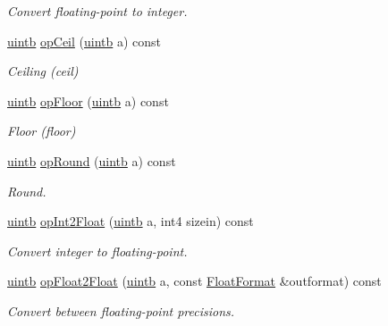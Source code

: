 \begin{DoxyCompactItemize}
\begin{DoxyCompactList}\small\item\em Convert floating-\/point to integer. \end{DoxyCompactList}\item 
\mbox{\hyperlink{types_8h_a2db313c5d32a12b01d26ac9b3bca178f}{uintb}} \mbox{\hyperlink{class_float_format_a997db68ddb2ee0835f3ffde93f4c4958}{op\+Ceil}} (\mbox{\hyperlink{types_8h_a2db313c5d32a12b01d26ac9b3bca178f}{uintb}} a) const
\begin{DoxyCompactList}\small\item\em Ceiling (ceil) \end{DoxyCompactList}\item 
\mbox{\hyperlink{types_8h_a2db313c5d32a12b01d26ac9b3bca178f}{uintb}} \mbox{\hyperlink{class_float_format_ad2e38aad3a27346e0eb55aedcbf531cd}{op\+Floor}} (\mbox{\hyperlink{types_8h_a2db313c5d32a12b01d26ac9b3bca178f}{uintb}} a) const
\begin{DoxyCompactList}\small\item\em Floor (floor) \end{DoxyCompactList}\item 
\mbox{\hyperlink{types_8h_a2db313c5d32a12b01d26ac9b3bca178f}{uintb}} \mbox{\hyperlink{class_float_format_adde6362a78f0ad6cd66fdd04c71032cf}{op\+Round}} (\mbox{\hyperlink{types_8h_a2db313c5d32a12b01d26ac9b3bca178f}{uintb}} a) const
\begin{DoxyCompactList}\small\item\em Round. \end{DoxyCompactList}\item 
\mbox{\hyperlink{types_8h_a2db313c5d32a12b01d26ac9b3bca178f}{uintb}} \mbox{\hyperlink{class_float_format_a610b9f8efe3b41368250940184691156}{op\+Int2\+Float}} (\mbox{\hyperlink{types_8h_a2db313c5d32a12b01d26ac9b3bca178f}{uintb}} a, int4 sizein) const
\begin{DoxyCompactList}\small\item\em Convert integer to floating-\/point. \end{DoxyCompactList}\item 
\mbox{\hyperlink{types_8h_a2db313c5d32a12b01d26ac9b3bca178f}{uintb}} \mbox{\hyperlink{class_float_format_a4adac47dcb6d1ddbcf9c5f6980528fd2}{op\+Float2\+Float}} (\mbox{\hyperlink{types_8h_a2db313c5d32a12b01d26ac9b3bca178f}{uintb}} a, const \mbox{\hyperlink{class_float_format}{Float\+Format}} \&outformat) const
\begin{DoxyCompactList}\small\item\em Convert between floating-\/point precisions. \end{DoxyCompactList}\item 

\end{DoxyCompactItemize}
